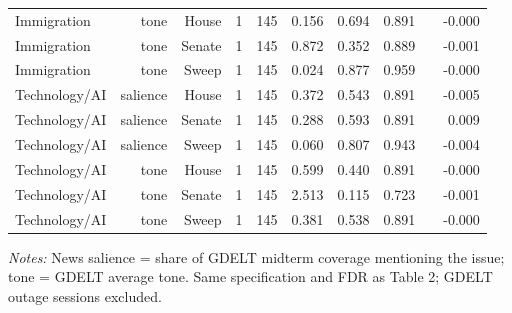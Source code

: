 \begin{table}[htbp]
\begin{tabular}{lrrrrrrrrr}
Immigration & tone & House & 1 & 145 & 0.156 & 0.694 & 0.891 &  & -0.000 \\
Immigration & tone & Senate & 1 & 145 & 0.872 & 0.352 & 0.889 &  & -0.001 \\
Immigration & tone & Sweep & 1 & 145 & 0.024 & 0.877 & 0.959 &  & -0.000 \\
Technology/AI & salience & House & 1 & 145 & 0.372 & 0.543 & 0.891 &  & -0.005 \\
Technology/AI & salience & Senate & 1 & 145 & 0.288 & 0.593 & 0.891 &  & 0.009 \\
Technology/AI & salience & Sweep & 1 & 145 & 0.060 & 0.807 & 0.943 &  & -0.004 \\
Technology/AI & tone & House & 1 & 145 & 0.599 & 0.440 & 0.891 &  & -0.000 \\
Technology/AI & tone & Senate & 1 & 145 & 2.513 & 0.115 & 0.723 &  & -0.001 \\
Technology/AI & tone & Sweep & 1 & 145 & 0.381 & 0.538 & 0.891 &  & -0.000 \\
\bottomrule
\end{tabular}
\par\smallskip\footnotesize\emph{Notes:} News salience = share of GDELT midterm coverage mentioning the issue; tone = GDELT average tone. Same specification and FDR as Table 2; GDELT outage sessions excluded.
\end{table}